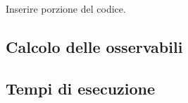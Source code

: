 Inserire porzione del codice.

\subsection*{Calcolo delle osservabili}

\subsection*{Tempi di esecuzione}